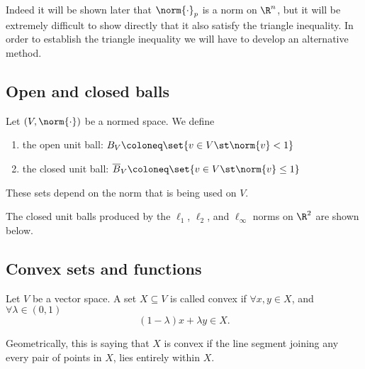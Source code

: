 \begin{remark}
  Indeed it will be shown later that $\norm{\cdot}_{p}$ is a norm on $\R^n$, but it will be extremely difficult to show directly that it also satisfy the triangle inequality. In order to establish the triangle inequality we will have to develop an alternative method.
\end{remark}

\subsection{Open and closed balls}
\begin{ndfn}
  Let $(V, \norm{\cdot})$ be a normed space. We define
  \begin{enumerate}
  \item the open unit ball: $\oB_{V} \coloneq \set{v \in V \st \norm{v} < 1}$
  \item the closed unit ball: $\cB_{V} \coloneq \set{v \in V \st \norm{v} \leq 1}$
  \end{enumerate}
\end{ndfn}
These sets depend on the norm that is being used on $V$.

The closed unit balls produced by the $\ell_{1}$, $\ell_{2}$, and $\ell_{\infty}$ norms on $\R^2$ are shown below.
\begin{center}
\end{center}

\subsection{Convex sets and functions}
\begin{ndfn}
  Let $V$ be a vector space. A set $X \subseteq V$ is called convex if $\forall x,y \in X$, and $\forall \lambda \in (0,1)$
  \begin{equation*}
    (1-\lambda) x + \lambda y \in X.
  \end{equation*}
\end{ndfn}
Geometrically, this is saying that $X$ is convex if the line segment joining any every pair of points in $X$, lies entirely within $X$.

